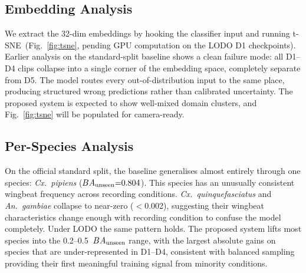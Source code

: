 \subsection{Embedding Analysis}
\label{sec:results:tsne}

We extract the 32-dim embeddings by hooking the classifier input
and running t-SNE~(Fig.~\ref{fig:tsne}, pending GPU computation on
the LODO D1 checkpoints).
Earlier analysis on the standard-split baseline shows a clean
failure mode: all D1--D4 clips collapse into a single corner of the
embedding space, completely separate from D5.
The model routes every out-of-distribution input to the same place,
producing structured wrong predictions rather than calibrated
uncertainty.
The proposed system is expected to show well-mixed domain clusters,
and Fig.~\ref{fig:tsne} will be populated for camera-ready.

\subsection{Per-Species Analysis}
\label{sec:results:species}

On the official standard split, the baseline generalises almost
entirely through one species: \emph{Cx.\ pipiens}
($BA_{\text{unseen}}{=}0.804$).
This species has an unusually consistent wingbeat frequency across
recording conditions.
\emph{Cx.\ quinquefasciatus} and \emph{An.\ gambiae} collapse to
near-zero ($<$0.002), suggesting their wingbeat characteristics change
enough with recording condition to confuse the model completely.
Under LODO the same pattern holds.
The proposed system lifts most species into the 0.2--0.5~$BA_{\text{unseen}}$
range, with the largest absolute gains on species that are
under-represented in D1--D4, consistent with balanced sampling
providing their first meaningful training signal from minority
conditions.
